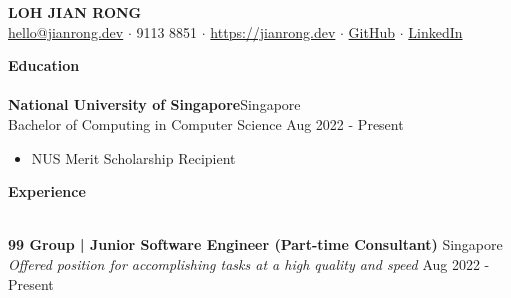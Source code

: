 \documentclass[a4paper]{article}
\newcommand{\lineunder} {
    \vspace*{-8pt} \\
    \hspace*{-12pt} \hrulefill \\
}
\newcommand{\header} [1] {
    {\hspace*{-12pt}\vspace*{6pt} \large\textbf{#1}}
    \vspace*{-6pt} \lineunder
}
\begin{document}
\vspace*{-40pt}

\begin{center}
	{\huge \scshape \textbf{LOH JIAN RONG}}\\
	\href{mailto:hello@jianrong.dev}{hello@jianrong.dev} $\cdot$ 9113 8851 $\cdot$ \href{https://jianrong.dev}{https://jianrong.dev} $\cdot$ \href{https://github.com/jianrong7}{GitHub} $\cdot$ \href{https://www.linkedin.com/in/jianrong7/}{LinkedIn}\\
\end{center}

\header{Education}
\vspace{1mm}
\textbf{National University of Singapore}\hfill Singapore\\
Bachelor of Computing in Computer Science \hfill Aug 2022 - Present\\
\vspace{-2mm}
\begin{itemize} \itemsep 1pt
	\item NUS Merit Scholarship Recipient
\end{itemize}

\header{Experience}
\vspace{1mm}

\textbf{99 Group | Junior Software Engineer (Part-time Consultant)} \hfill Singapore\\
\textit{Offered position for accomplishing tasks at a high quality and speed} \hfill Aug 2022 - Present\\
\vspace{2mm}
\end{document}
